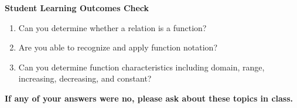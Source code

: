 \noindent \textbf{Student Learning Outcomes Check}

\begin{enumerate}
\item Can you determine whether a relation is a function?
\item Are you able to recognize and apply function notation?
\item Can you determine function characteristics including domain, range, increasing, decreasing, and constant?
\end{enumerate}

\noindent \textbf{If any of your answers were no, please ask about these topics in class.}


